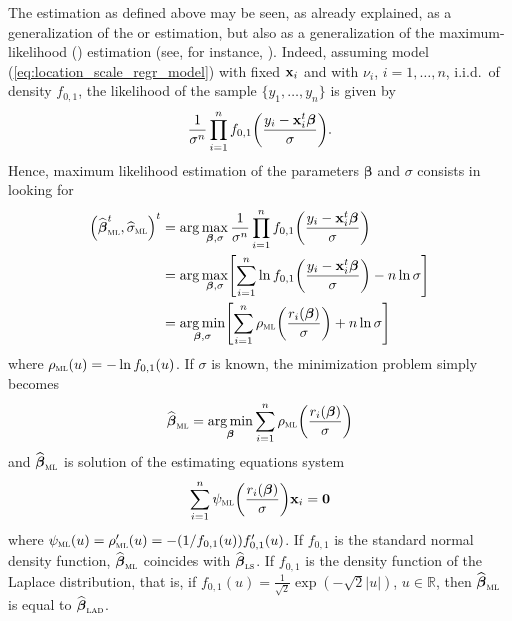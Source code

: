 The  estimation as defined above may be seen, as already explained, as
a generalization of the  or  estimation, but also as a
generalization of the maximum-likelihood () estimation (see, for
instance, \citealp{maronna:etal:2006}). Indeed, assuming model
(\ref{eq:location_scale_regr_model}) with fixed $\mathbf x_{i}$ and with
$\nu_{i}$, $i = 1, \dots, n$, i.i.d.\ of density $f_{0,1}$, the likelihood of
the sample $\{y_{1}, \dots, y_{n}\}$ is given by                                
\[
    \frac{1}{\sigma^{n}}\prod\limits_{i=1}^{n}
    f_{0,1}\left(\frac{y_{i}-\stvec{x}_{i}^t\boldsymbol\beta}{\sigma}\right).
\]
Hence, maximum likelihood estimation of the parameters $\boldsymbol\beta$
and $\sigma$ consists in looking for
%
\begin{align}
    \left(\sthat{\boldsymbol\beta}_{\stsc{ML}}^t,\sthat{\sigma}_{\stsc{ML}}\right)^t
    &= \arg\max_{\boldsymbol\beta,\sigma} \frac{1}{\sigma^{n}} \prod\limits_{i=1}^{n}
        f_{0,1}\left(\frac{y_{i}-\stvec{x}_{i}^t\boldsymbol\beta}{\sigma}\right)
    \nonumber\\
    &= \arg\max_{\boldsymbol\beta,\sigma} \left[\sum_{i=1}^{n}
        \ln f_{0,1}\left(\frac{y_{i}-\stvec{x}_{i}^t\boldsymbol\beta}{\sigma}\right) - n\ln\sigma\right]
    \nonumber\\
    & = \argmin_{\boldsymbol\beta,\sigma} \left[\sum_{i=1}^{n}
        \rho_{\stsc{ML}}\left(\frac{r_{i}(\boldsymbol\beta)}{\sigma}\right) + n\ln\sigma\right]
    \label{eq:ML_beta_sigma_min}
\end{align}
%
where $\rho_{\stsc{ML}}(u) = -\ln f_{0,1}(u)$. If $\sigma$ is known, the
minimization problem simply becomes
%
\begin{equation}\label{eq:ML_beta_min}
    \sthat{\boldsymbol\beta}_{\stsc{ML}} 
        = \argmin_{\boldsymbol\beta}\sum_{i=1}^{n} 
            \rho_{\stsc{ML}}\left(\frac{r_{i}(\boldsymbol\beta)}{\sigma}\right)
\end{equation}
%
and $\sthat{\boldsymbol\beta}_{\stsc{ML}}$ is solution of the estimating
equations system
\[
    \sum_{i=1}^{n} \psi_{\stsc{ML}}\left(\frac{r_{i}(\boldsymbol\beta)}{\sigma}\right) \stvec{x}_{i} = \stvec{0}
\]
where $\psi_{\stsc{ML}}(u) = \rho_{\stsc{ML}}'(u) = - (1/f_{0,1}(u))
f_{0,1}'(u)$. If $f_{0,1}$ is the standard normal density function,
$\sthat{\boldsymbol\beta}_{\stsc{ML}}$ coincides with
$\sthat{\boldsymbol\beta}_{\stsc{LS}}$. If $f_{0,1}$ is the density function of
the Laplace distribution, that is, if $f_{0,1}(u) =
\frac{1}{\sqrt{2}}\exp(-\sqrt{2}|u|)$, $u\in\mathbb{R}$, then
$\sthat{\boldsymbol\beta}_{\stsc{ML}}$ is equal to
$\sthat{\boldsymbol\beta}_{\stsc{LAD}}$.

